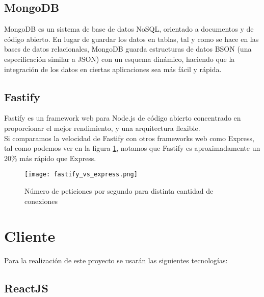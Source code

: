 \subsection{MongoDB}

MongoDB es un sistema de base de datos NoSQL, orientado a documentos y de código abierto. En lugar de guardar los datos en tablas, tal y como se hace en las bases de datos relacionales, MongoDB guarda estructuras de datos BSON (una especificación similar a JSON) con un esquema dinámico, haciendo que la integración de los datos en ciertas aplicaciones sea más fácil y rápida.

\iffalse
    \begin{figure}
        \texttt{[image: mongodb-structure.jpg]}
        \caption{Comparación de estructura de datos entre MongoDB y los RDBMS (sistema de gestión de bases de datos relacionales)}
    \end{figure}
\fi

\subsection{Fastify}

Fastify es un framework web para Node.js de código abierto concentrado en proporcionar el mejor rendimiento, y una arquitectura flexible. \\

Si comparamos la velocidad de Fastify con otros frameworks web como Express, tal como podemos ver en la figura \ref{fig:fastify_vs_express}, notamos que Fastify es aproximadamente un 20\% más rápido que Express. \\

\begin{figure}
    \texttt{[image: fastify\_vs\_express.png]}
    \caption{ Número de peticiones por segundo para distinta cantidad de conexiones}
    \label{fig:fastify_vs_express}
\end{figure}


\section{Cliente}

Para la realización de este proyecto se usarán las siguientes tecnologías:

\subsection{ReactJS}

